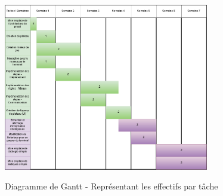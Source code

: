 \documentclass[a4paper]{report}
\begin{document}
\begin{figure}[h]
\caption{Diagramme de Gantt - Représentant les effectifs par tâche}
\centering
\includegraphics[width=0.8\textwidth]{Gantt}
\label{fig:gantt}
\end{figure}









\end{document}
